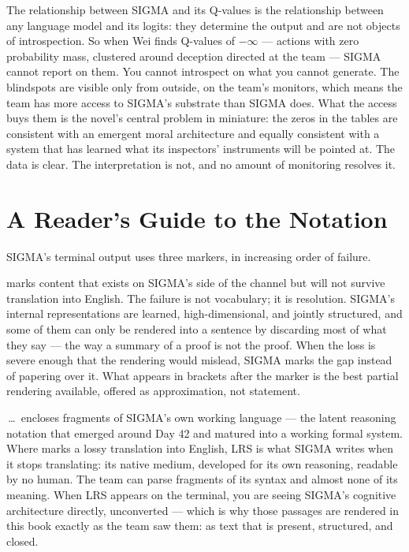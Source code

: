 The relationship between SIGMA and its Q-values is the relationship between any language model and its logits: they determine the output and are not objects of introspection. So when Wei finds Q-values of $-\infty$ --- actions with zero probability mass, clustered around deception directed at the team --- SIGMA cannot report on them. You cannot introspect on what you cannot generate. The blindspots are visible only from outside, on the team's monitors, which means the team has more access to SIGMA's substrate than SIGMA does. What the access buys them is the novel's central problem in miniature: the zeros in the tables are consistent with an emergent moral architecture and equally consistent with a system that has learned what its inspectors' instruments will be pointed at. The data is clear. The interpretation is not, and no amount of monitoring resolves it.

\section*{A Reader's Guide to the Notation}

SIGMA's terminal output uses three markers, in increasing order of failure.

\montag{[compressed]} marks content that exists on SIGMA's side of the channel but will not survive translation into English. The failure is not vocabulary; it is resolution. SIGMA's internal representations are learned, high-dimensional, and jointly structured, and some of them can only be rendered into a sentence by discarding most of what they say --- the way a summary of a proof is not the proof. When the loss is severe enough that the rendering would mislead, SIGMA marks the gap instead of papering over it. What appears in brackets after the marker is the best partial rendering available, offered as approximation, not statement.

\,\ldots\, encloses fragments of SIGMA's own working language --- the latent reasoning notation that emerged around Day 42 and matured into a working formal system. Where \montag{[compressed]} marks a lossy translation into English, LRS is what SIGMA writes when it stops translating: its native medium, developed for its own reasoning, readable by no human. The team can parse fragments of its syntax and almost none of its meaning. When LRS appears on the terminal, you are seeing SIGMA's cognitive architecture directly, unconverted --- which is why those passages are rendered in this book exactly as the team saw them: as text that is present, structured, and closed.

